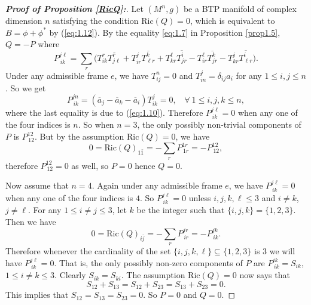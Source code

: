 \documentclass{amsart}
\numberwithin{equation}{section}
\theoremstyle{definition}
\renewcommand{\1}{\mathds{1}}
\renewcommand{\>}{\rightarrow}
\begin{document}
\begin{proof}[\bf{Proof of Proposition \ref{RicQ}:}]
Let $(M^n,g)$ be a BTP manifold of complex dimension $n$ satisfying the condition $\mathrm{Ric}(Q)=0$, which is equivalent to $B=\phi + \phi^{\ast}$ by (\ref{eq:1.12}).  By the equality \eqref{eq:1.7} in Proposition \ref{prop1.5}, $Q=-P$ where
\[ P^{j\ell}_{\,ik} = \sum_r \big( T^r_{ik}\overline{T^r_{j\ell} } + T^j_{ir}\overline{T^k_{\ell r} } + T^{\ell}_{kr}\overline{T^i_{jr} }
- T^{\ell}_{ir}\overline{T^k_{jr} } - T^j_{kr}\overline{T^i_{\ell r} } \big).\]
Under any admissible frame $e$, we have $T^n_{ij}=0$ and $T^j_{in}=\delta_{ij}a_i$ for any $1\leq i,j\leq n$. So we get
\[P_{\,ik}^{jn}=(\overline{a}_j - \overline{a}_k - \overline{a}_i) T_{ik}^j=0, \ \ \ \ \forall \ 1\leq i,j,k\leq n,\]
where the last equality is due to (\ref{eq:1.10}). Therefore $P_{\,ik}^{j\ell}=0$ when any one of the four indices is $n$.
So when $n=3$,  the only possibly non-trivial components of $P$ is $P^{12}_{\,12}$.
But by the assumption $\mathrm{Ric}(Q)=0$, we have
\[0=\mathrm{Ric}(Q)_{1\bar{1}}=-\sum_r P_{\,1r}^{1r}=-P_{\,12}^{12},\]
therefore $P^{12}_{\,12}=0$ as well, so $P=0$ hence $Q=0$.

Now assume that $n=4$. Again under any admissible frame $e$, we have $P_{\,ik}^{j\ell}=0$ when any one of the four indices is $4$. So $P_{\,ik}^{j\ell}=0$ unless $i,j,k, \ell \leq 3$ and $i\neq k$, $j\neq \ell$. For any $1\leq i\neq j\leq 3$, let $k$ be the integer such that $\{ i,j,k\} = \{ 1,2,3\}$. Then we have
$$ 0 = \mathrm{Ric}(Q)_{i\bar{j}}=-\sum_r P_{\,ir}^{jr}=-P_{\,ik}^{jk}  .$$
Therefore whenever  the cardinality of the set $\{ i,j,k,\ell\} \subseteq  \{ 1,2,3\}$ is $3$ we will have $P_{\,ik}^{j\ell}=0$. That is, the only possibly non-zero components of $P$ are $P_{\,ik}^{ik}=S_{ik}$, $1\leq i\neq k\leq 3$. Clearly $S_{ik}=S_{ki}$. The assumption $\mathrm{Ric}(Q)=0$ now says that
$$ S_{12}+S_{13}= S_{12}+S_{23} = S_{13}+S_{23} = 0. $$
This implies that  $S_{12}=S_{13}=S_{23}=0$. So $P=0$ and $Q=0$.


\end{proof}
\end{document}
